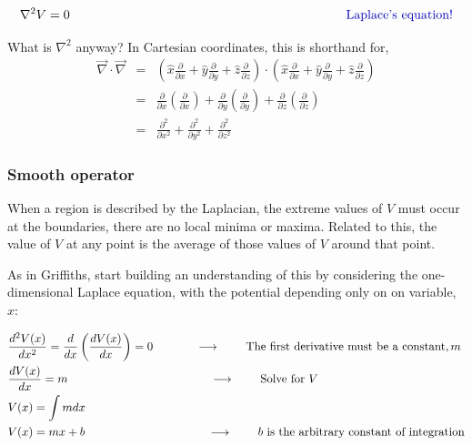 \documentclass[12pt]{article}
\begin{document}
\begin{flushleft}
\[
\nabla^{2} V = 0 \hspace{3.in} \mbox{\color{myblue} Laplace's equation!} 
\]

\vspace{.2in}
What is $\nabla^{2}$ anyway?  In Cartesian coordinates, this is shorthand for,
\begin{eqnarray*}
\vec{\nabla} \cdot \vec{\nabla} & = & \left(\hat{x}\frac{\partial}{\partial x} +\hat{y}\frac{\partial}{\partial y}+\hat{z}\frac{\partial}{\partial z}\right) \cdot \left(\hat{x}\frac{\partial}{\partial x} +\hat{y}\frac{\partial}{\partial y}+\hat{z}\frac{\partial}{\partial z}\right) \\
& = & \frac{\partial}{\partial x}\left(\frac{\partial}{\partial x}\right) +\frac{\partial}{\partial y}\left(\frac{\partial}{\partial y}\right)+\frac{\partial}{\partial z} \left(\frac{\partial}{\partial z}\right) \\
& = & \frac{\partial^{2}}{\partial x^{2}} +\frac{\partial^{2}}{\partial y^{2}}+\frac{\partial^{2}}{\partial z^{2}} 
\end{eqnarray*}

\subsubsection*{Smooth operator}

When a region is described by the Laplacian, the extreme values of $V$ must occur at the boundaries, there are no local minima or maxima.  Related to this, the value of $V$ at any point is the average of those values of $V$ around that point.

As in Griffiths, start building an understanding of this by considering the one-dimensional Laplace equation, with the potential depending only on on variable, $x$:

\begin{equation*}
\begin{aligned}
& \frac{d^{2}V(x)}{dx^{2}} = \frac{d}{dx} \left( \frac{ dV(x) }{dx} \right) = 0 \hspace{.5in} \longrightarrow \hspace{.3in} \mbox{The first derivative must be a constant,} \, m \\
&  \frac{dV(x)}{dx} = m \hspace{1.68in} \longrightarrow \hspace{.3in} \mbox{Solve for $V$} \\
& V(x) = \int mdx \\
& V(x) = mx + b   \hspace{1.45in} \longrightarrow \hspace{.3in} \mbox{$b$ is the arbitrary constant of  integration}
\end{aligned}
\end{equation*}


\end{flushleft}
\end{document}
